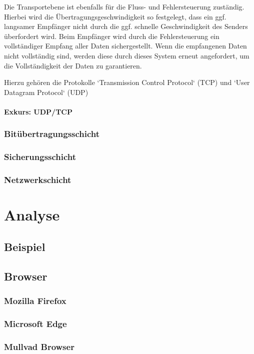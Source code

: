 \documentclass[12pt]{article}
\begin{document}
 Die Transportebene ist ebenfalls für die Fluss- und Fehlersteuerung zuständig. Hierbei wird die Übertragungsgeschwindigkeit so festgelegt, dass ein ggf. langsamer Empfänger nicht durch die ggf. schnelle Geschwindigkeit des Senders überfordert wird. Beim Empfänger wird durch die Fehlersteuerung ein vollständiger Empfang aller Daten sichergestellt. Wenn die empfangenen Daten nicht vollständig sind, werden diese durch dieses System erneut angefordert, um die Vollständigkeit der Daten zu garantieren. 
 
 Hierzu gehören die Protokolle `Transmission Control Protocol` (TCP) und `User Datagram Protocol` (UDP)
 
 
\paragraph{Exkurs: UDP/TCP}
   
\subsubsection{Bitübertragungsschicht}
\subsubsection{Sicherungsschicht}
\subsubsection{Netzwerkschicht}





\section{Analyse}
\subsection{Beispiel}
\subsection{Browser}
\subsubsection{Mozilla Firefox}
\subsubsection{Microsoft Edge}
 \subsubsection{Mullvad Browser}
\end{document}
